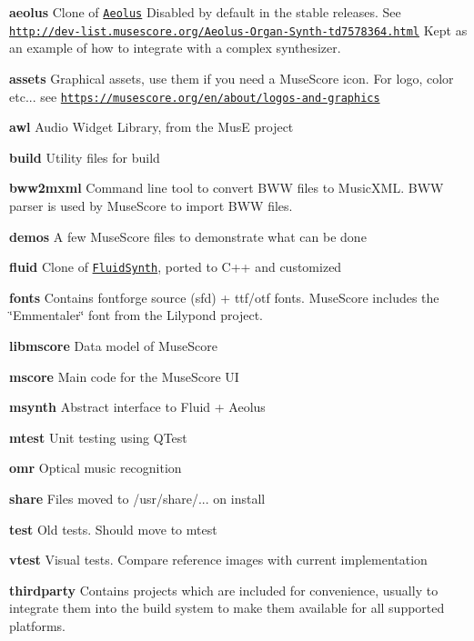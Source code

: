 \begin{DoxyItemize}
\item {\bfseries aeolus} Clone of \href{http://kokkinizita.linuxaudio.org/linuxaudio/aeolus/}{\tt Aeolus} Disabled by default in the stable releases. See \href{http://dev-list.musescore.org/Aeolus-Organ-Synth-td7578364.html}{\tt http\+://dev-\/list.\+musescore.\+org/\+Aeolus-\/\+Organ-\/\+Synth-\/td7578364.\+html} Kept as an example of how to integrate with a complex synthesizer.
\item {\bfseries assets} Graphical assets, use them if you need a Muse\+Score icon. For logo, color etc... see \href{https://musescore.org/en/about/logos-and-graphics}{\tt https\+://musescore.\+org/en/about/logos-\/and-\/graphics}
\item {\bfseries awl} Audio Widget Library, from the MusE project
\item {\bfseries build} Utility files for build
\item {\bfseries bww2mxml} Command line tool to convert B\+WW files to Music\+X\+ML. B\+WW parser is used by Muse\+Score to import B\+WW files.
\item {\bfseries demos} A few Muse\+Score files to demonstrate what can be done
\item {\bfseries fluid} Clone of \href{https://sourceforge.net/projects/fluidsynth/}{\tt Fluid\+Synth}, ported to C++ and customized
\item {\bfseries fonts} Contains fontforge source (sfd) + ttf/otf fonts. Muse\+Score includes the \char`\"{}\+Emmentaler\char`\"{} font from the Lilypond project.
\item {\bfseries libmscore} Data model of Muse\+Score
\item {\bfseries mscore} Main code for the Muse\+Score UI
\item {\bfseries msynth} Abstract interface to Fluid + Aeolus
\item {\bfseries mtest} Unit testing using Q\+Test
\item {\bfseries omr} Optical music recognition
\item {\bfseries share} Files moved to /usr/share/... on install
\item {\bfseries test} Old tests. Should move to mtest
\item {\bfseries vtest} Visual tests. Compare reference images with current implementation
\item {\bfseries thirdparty} Contains projects which are included for convenience, usually to integrate them into the build system to make them available for all supported platforms.

\end{DoxyItemize}
